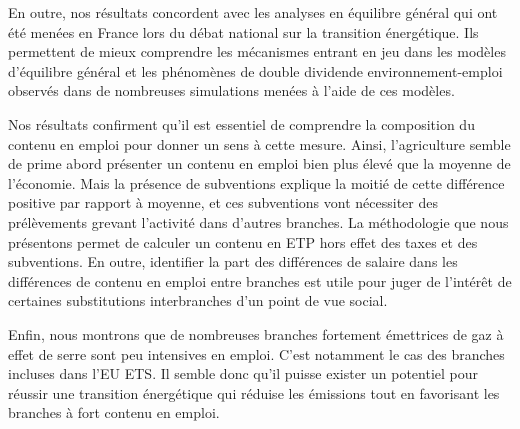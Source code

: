 En outre, nos résultats concordent avec les analyses en équilibre général qui ont été menées en France lors du débat national sur la transition énergétique. Ils permettent de mieux comprendre les mécanismes entrant en jeu dans les modèles d’équilibre général et les phénomènes de double dividende environnement-emploi observés dans de nombreuses simulations menées à l’aide de ces modèles.

Nos résultats confirment qu’il est essentiel de comprendre la composition du contenu en emploi pour donner un sens à cette mesure. 
Ainsi, l’agriculture semble de prime abord présenter un contenu en emploi bien plus élevé que la moyenne de l’économie. Mais la présence de subventions explique la moitié de cette différence positive par rapport à moyenne, et ces subventions vont nécessiter des prélèvements grevant l’activité dans d'autres branches. 
La méthodologie que nous présentons permet de calculer un contenu en ETP hors effet des taxes et des subventions. En outre, identifier la part des différences de salaire dans les différences de contenu en emploi entre branches est utile pour juger de l’intérêt de certaines substitutions interbranches d’un point de vue social.

Enfin, nous montrons que de nombreuses branches fortement émettrices de gaz à effet de serre sont peu intensives en emploi. C’est notamment le cas des branches incluses dans l’EU ETS. Il semble donc qu’il puisse exister un potentiel pour réussir une transition énergétique qui réduise les émissions tout en favorisant les branches à fort contenu en emploi.



